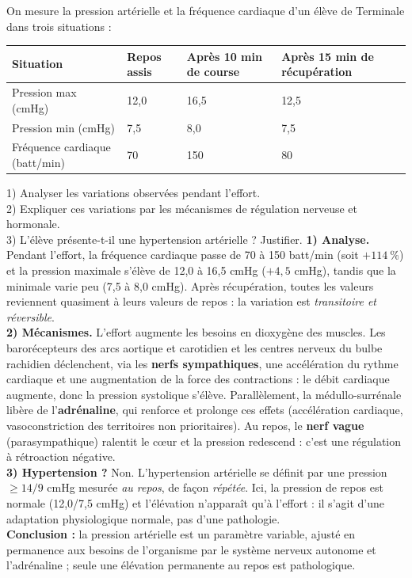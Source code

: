 \documentclass[11pt]{article}
\begin{document}
\begin{exoresolu}
On mesure la pression artérielle et la fréquence cardiaque d'un élève de Terminale dans trois situations :
\begin{center}
\begin{tabularx}{\linewidth}{|l|X|X|X|}\hline
\rowcolor{popblueL} Situation & Repos assis & Après 10 min de course & Après 15 min de récupération \\ \hline
Pression max (cmHg) & 12,0 & 16,5 & 12,5 \\ \hline
Pression min (cmHg) & 7,5 & 8,0 & 7,5 \\ \hline
Fréquence cardiaque (batt/min) & 70 & 150 & 80 \\ \hline
\end{tabularx}
\end{center}
1) Analyser les variations observées pendant l'effort.\\
2) Expliquer ces variations par les mécanismes de régulation nerveuse et hormonale.\\
3) L'élève présente-t-il une hypertension artérielle ? Justifier.
\tcblower
\textbf{1) Analyse.} Pendant l'effort, la fréquence cardiaque passe de 70 à 150 batt/min (soit $+114\ \%$) et la pression maximale s'élève de 12,0 à 16,5 cmHg ($+4,5$ cmHg), tandis que la minimale varie peu (7,5 à 8,0 cmHg). Après récupération, toutes les valeurs reviennent quasiment à leurs valeurs de repos : la variation est \emph{transitoire et réversible}.\\[2mm]
\textbf{2) Mécanismes.} L'effort augmente les besoins en dioxygène des muscles. Les barorécepteurs des arcs aortique et carotidien et les centres nerveux du bulbe rachidien déclenchent, via les \textbf{nerfs sympathiques}, une accélération du rythme cardiaque et une augmentation de la force des contractions : le débit cardiaque augmente, donc la pression systolique s'élève. Parallèlement, la médullo-surrénale libère de l'\textbf{adrénaline}, qui renforce et prolonge ces effets (accélération cardiaque, vasoconstriction des territoires non prioritaires). Au repos, le \textbf{nerf vague} (parasympathique) ralentit le c\oe ur et la pression redescend : c'est une régulation à rétroaction négative.\\[2mm]
\textbf{3) Hypertension ?} Non. L'hypertension artérielle se définit par une pression $\geq 14/9$ cmHg mesurée \emph{au repos}, de façon \emph{répétée}. Ici, la pression de repos est normale (12,0/7,5 cmHg) et l'élévation n'apparaît qu'à l'effort : il s'agit d'une adaptation physiologique normale, pas d'une pathologie.\\
\textbf{Conclusion :} la pression artérielle est un paramètre variable, ajusté en permanence aux besoins de l'organisme par le système nerveux autonome et l'adrénaline ; seule une élévation permanente au repos est pathologique.
\end{exoresolu}
\end{document}

